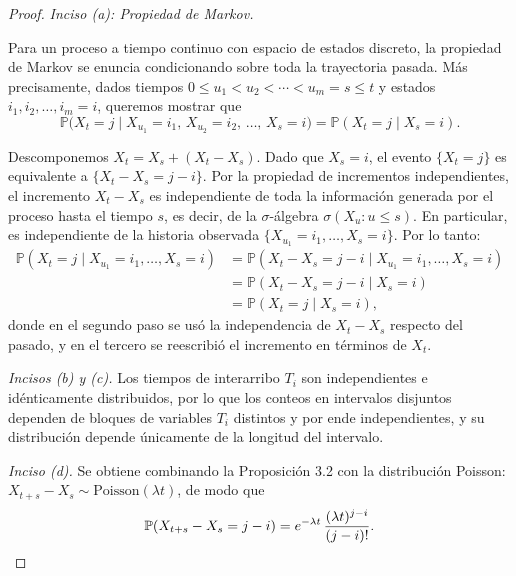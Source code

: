 \documentclass[12pt]{book}
\begin{document}
\begin{proof}
\textit{Inciso (a): Propiedad de Markov.}

Para un proceso a tiempo continuo con espacio de estados discreto, la propiedad de Markov se enuncia condicionando sobre toda la trayectoria pasada. Más precisamente, dados tiempos $0 \le u_1 < u_2 < \cdots < u_m = s \le t$ y estados $i_1, i_2, \ldots, i_m = i$, queremos mostrar que
\[
    \mathbb{P}\!\bigl(X_t = j \mid X_{u_1}=i_1,\, X_{u_2}=i_2,\, \ldots,\, X_s = i\bigr) = \mathbb{P}(X_t = j \mid X_s = i).
\]

Descomponemos $X_t = X_s + (X_t - X_s)$. Dado que $X_s = i$, el evento $\{X_t = j\}$ es equivalente a $\{X_t - X_s = j - i\}$. Por la propiedad de incrementos independientes, el incremento $X_t - X_s$ es independiente de toda la información generada por el proceso hasta el tiempo $s$, es decir, de la $\sigma$-álgebra $\sigma(X_u : u \le s)$. En particular, es independiente de la historia observada $\{X_{u_1}=i_1, \ldots, X_s=i\}$. Por lo tanto:
\begin{align*}
    \mathbb{P}(X_t = j \mid X_{u_1}=i_1, \ldots, X_s = i)
    &= \mathbb{P}(X_t - X_s = j-i \mid X_{u_1}=i_1, \ldots, X_s=i) \\
    &= \mathbb{P}(X_t - X_s = j-i \mid X_s = i) \\
    &= \mathbb{P}(X_t = j \mid X_s = i),
\end{align*}
donde en el segundo paso se usó la independencia de $X_t - X_s$ respecto del pasado, y en el tercero se reescribió el incremento en términos de $X_t$.

\medskip
\textit{Incisos (b) y (c).} Los tiempos de interarribo $T_i$ son independientes e idénticamente distribuidos, por lo que los conteos en intervalos disjuntos dependen de bloques de variables $T_i$ distintos y por ende independientes, y su distribución depende únicamente de la longitud del intervalo.

\medskip
\textit{Inciso (d).} Se obtiene combinando la Proposición 3.2 con la distribución Poisson: $X_{t+s} - X_s \sim \mathrm{Poisson}(\lambda t)$, de modo que
\[
    \mathbb{P}(X_{t+s} - X_s = j - i) = e^{-\lambda t}\,\frac{(\lambda t)^{j-i}}{(j-i)!}.\qedhere
\]
\end{proof}
\end{document}
